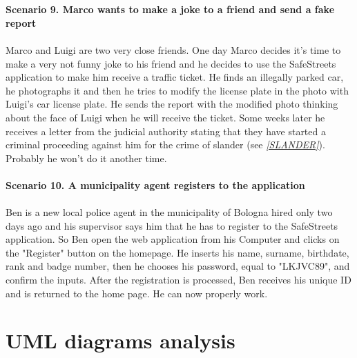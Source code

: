 \documentclass[a4paper]{report}
\begin{document}
\\ 
\\
\label{use:slander}\textbf{Scenario 9. Marco wants to make a joke to a friend and send a fake report}\\
\\
Marco and Luigi are two very close friends. One day Marco decides it's time to make a very not funny joke to his friend and he decides to use the SafeStreets application to make him receive a traffic ticket. He finds an illegally parked car, he photographs it and then he tries to modify the license plate in the photo with Luigi's car license plate. He sends the report with the modified photo thinking about the face of Luigi when he will receive the ticket. 
Some weeks later he receives a letter from the judicial authority stating that they have started a criminal proceeding against him for the crime of slander (see \hyperref[ref:slander]{\textit{[SLANDER]}}).
Probably he won't do it another time. 
\\ 
\\
\textbf{Scenario 10. A municipality agent registers to the application}\\
\\
Ben is a new local police agent in the municipality of Bologna hired only two days ago and his supervisor says him that he has to register to the SafeStreets application. So Ben open the web application from his Computer and clicks on the "Register" button on the homepage. He inserts his name, surname, birthdate, rank and badge number, then he chooses his password, equal to "LKJVC89", and confirm the inputs. After the registration is processed, Ben receives his unique ID and is returned to the home page. He can now properly work.

\section{UML diagrams analysis}
\end{document}
